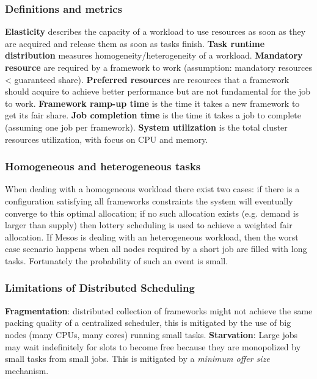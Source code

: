 		\subsubsection{Definitions and metrics}
		\textbf{Elasticity} describes the capacity of a workload to use resources as soon as they are acquired and release them as soon as tasks finish.\newline
		\textbf{Task runtime distribution} measures homogeneity/heterogeneity of a workload.\newline
		\textbf{Mandatory resource} are required by a framework to work (assumption: mandatory resources < guaranteed share).\newline
		\textbf{Preferred resources} are resources that a framework should acquire to achieve better performance but are not fundamental for the job to work.\newline
		\newline
		\textbf{Framework ramp-up time} is the time it takes a new framework to get its fair share.\newline
		\textbf{Job completion time} is the time it takes a job to complete (assuming one job per framework).\newline
		\textbf{System utilization} is the total cluster resources utilization, with focus on CPU and memory.
		\subsubsection{Homogeneous and heterogeneous tasks}
		When dealing with a homogeneous workload there exist two cases: if there is a configuration satisfying all frameworks constraints the system will eventually converge to this optimal allocation; if no such allocation exists (e.g. demand is larger than supply) then lottery scheduling is used to achieve a weighted fair allocation.\newline
		If Mesos is dealing with an heterogeneous workload, then the worst case scenario happens when all nodes required by a short job are filled with long tasks. Fortunately the probability of such an event is small.
		\subsubsection{Limitations of Distributed Scheduling}
		\textbf{Fragmentation}: distributed collection of frameworks might not achieve the same packing quality of a centralized scheduler, this is mitigated by the use of big nodes (many CPUs, many cores) running small tasks.\newline
		\textbf{Starvation}: Large jobs may wait indefinitely for slots to become free because they are monopolized by small tasks from small jobs. This is mitigated by a \textit{minimum offer size} mechanism.
		
